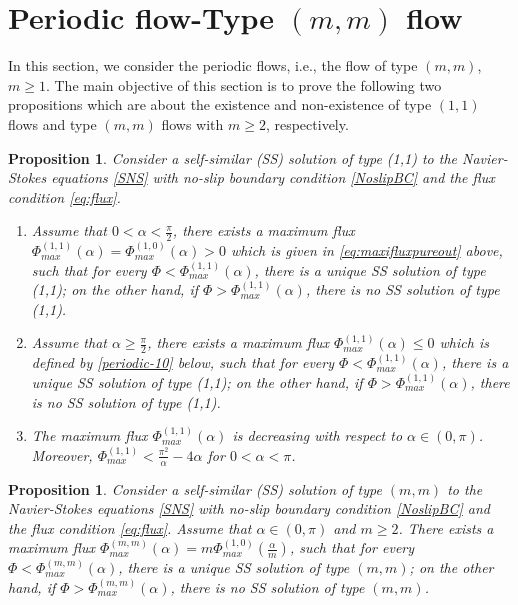 \documentclass[reqno,12pt]{amsart}
\newtheorem{pro}[theorem]{Proposition}
\begin{document}
\section{Periodic flow-Type $(m, m)$ flow}\label{sectionperiodicflow}
In this section, we consider the periodic flows, i.e., the flow of type $(m, m)$, $m\geq 1$.
The main objective of this section is to prove the following two propositions which are about the existence and non-existence of type $(1,1)$ flows and type $(m,m)$ flows with $m\geq 2$, respectively. 
\begin{pro}\label{Lemmaperiodicflow1}
Consider a self-similar (SS) solution of type (1,1) to the Navier-Stokes equations \eqref{SNS} with no-slip boundary condition \eqref{NoslipBC} and the flux condition \eqref{eq:flux}.
\begin{enumerate}
  \item 
  Assume that $0< \alpha < \frac{\pi}{2}$, there exists a maximum flux  $\Phi_{max}^{(1,1)}(\alpha)=\Phi_{max}^{(1, 0)}(\alpha)> 0$ which is given in \eqref{eq:maxifluxpureout} above, such that for every $\Phi <  \Phi_{max}^{(1, 1)}(\alpha)$, there is a unique SS solution of type (1,1); on the other hand, if $\Phi > \Phi_{max}^{(1, 1)}(\alpha)$, there is no SS solution of type (1,1).
\item
Assume that $\alpha \geq \frac{\pi}{2}$, there exists a maximum flux $\Phi_{max}^{(1, 1)} (\alpha)\leq 0$ which is defined by \eqref{periodic-10} below, such that for every $\Phi < \Phi_{max}^{(1, 1)}(\alpha)$, there is a unique SS solution of type (1,1); on the other hand, if $\Phi > \Phi_{max}^{(1, 1)} (\alpha)$, there is no SS solution of type (1,1). 
\item 
 The maximum flux $\Phi_{max}^{(1, 1)}(\alpha)$ is decreasing with respect to $\alpha\in(0,\pi)$. Moreover,  $\Phi^{(1,1)}_{max}<\frac{\pi^2}{\alpha}-4\alpha$ for $0<\alpha<\pi$.
\end{enumerate}
\end{pro}

\begin{pro}\label{pro:periodicflow2}
Consider a self-similar (SS) solution of type $(m,m)$ to the Navier-Stokes equations \eqref{SNS} with no-slip boundary condition \eqref{NoslipBC} and the flux condition \eqref{eq:flux}.
Assume that  $\alpha\in (0, \pi)$ and $m\geq 2$. There exists a maximum flux $\Phi_{max}^{(m, m)}(\alpha) = m \Phi_{max}^{(1, 0)}\left(\frac{\alpha}{m}\right)$, such that
for every $\Phi < \Phi_{max}^{(m, m)}(\alpha)$, there is a unique SS solution of type $(m,m)$; on the other hand, if $\Phi >\Phi_{max}^{(m, m)}(\alpha)$, there is no SS solution of type $(m,m)$.
\end{pro}
\end{document}
